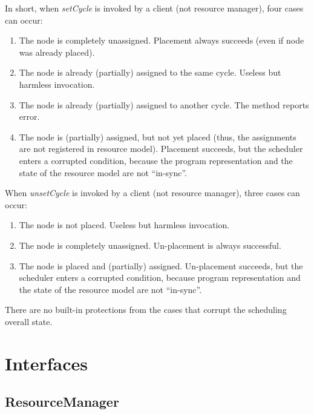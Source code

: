 \documentclass[a4paper,twoside]{tce}
\begin{document}
In short, when \emph{setCycle} is invoked by a client (not resource
manager), four cases can occur:
\begin{enumerate}
\item %
  The node is completely unassigned. Placement always succeeds (even if node
  was already placed).
\item %
  The node is already (partially) assigned to the same cycle. Useless but
  harmless invocation.
\item %
  The node is already (partially) assigned to another cycle. The method
  reports error.
\item %
  The node is (partially) assigned, but not yet placed (thus, the
  assignments are not registered in resource model). Placement succeeds, but
  the scheduler enters a corrupted condition, because the program
  representation and the state of the resource model are not ``in-sync''.
\end{enumerate}

When \emph{unsetCycle} is invoked by a client (not resource manager), three
cases can occur:
\begin{enumerate}
\item %
  The node is not placed. Useless but harmless invocation.
\item %
  The node is completely unassigned. Un-placement is always successful.
\item %
  The node is placed and (partially) assigned. Un-placement succeeds, but
  the scheduler enters a corrupted condition, because program
  representation and the state of the resource model are not ``in-sync''.
\end{enumerate}

There are no built-in protections from the cases that corrupt the scheduling
overall state.

\section{Interfaces}

\subsection{ResourceManager}
\end{document}
